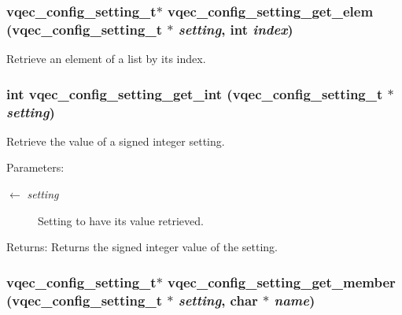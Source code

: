 \subsubsection{\setlength{\rightskip}{0pt plus 5cm}\bf{vqec\_\-config\_\-setting\_\-t}$\ast$ vqec\_\-config\_\-setting\_\-get\_\-elem (\bf{vqec\_\-config\_\-setting\_\-t} $\ast$ {\em setting}, int {\em index})}\label{vqec__config__parser_8c_4fcdc34e151d833e48c551d02d0ca51c}


Retrieve an element of a list by its index. 
\subsubsection{\setlength{\rightskip}{0pt plus 5cm}int vqec\_\-config\_\-setting\_\-get\_\-int (\bf{vqec\_\-config\_\-setting\_\-t} $\ast$ {\em setting})}\label{vqec__config__parser_8c_e5f8a085569a7a8e75efcef0e4bc98ac}


Retrieve the value of a signed integer setting.

\begin{Desc}
\item[Parameters:]
\begin{description}
\item[\mbox{$\leftarrow$} {\em setting}]Setting to have its value retrieved. \end{description}
\end{Desc}
\begin{Desc}
\item[Returns:]Returns the signed integer value of the setting. \end{Desc}
\subsubsection{\setlength{\rightskip}{0pt plus 5cm}\bf{vqec\_\-config\_\-setting\_\-t}$\ast$ vqec\_\-config\_\-setting\_\-get\_\-member (\bf{vqec\_\-config\_\-setting\_\-t} $\ast$ {\em setting}, char $\ast$ {\em name})}\label{vqec__config__parser_8c_27730b04cc0a10473d7d134a0472cca4}


